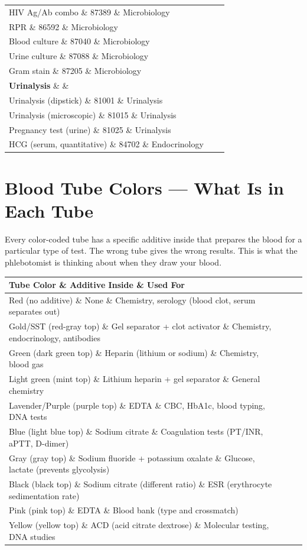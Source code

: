 \begin{longtable}{@{}lll@{}}
HIV Ag/Ab combo \& 87389 \& Microbiology \\
RPR \& 86592 \& Microbiology \\
Blood culture \& 87040 \& Microbiology \\
Urine culture \& 87088 \& Microbiology \\
Gram stain \& 87205 \& Microbiology \\
\textbf{Urinalysis} \& \& \\
Urinalysis (dipstick) \& 81001 \& Urinalysis \\
Urinalysis (microscopic) \& 81015 \& Urinalysis \\
Pregnancy test (urine) \& 81025 \& Urinalysis \\
HCG (serum, quantitative) \& 84702 \& Endocrinology \\
\bottomrule
\end{longtable}

\clearpage
\section{Blood Tube Colors --- What Is in Each Tube}

Every color-coded tube has a specific additive inside that prepares the blood for a particular type of test. The wrong tube gives the wrong results. This is what the phlebotomist is thinking about when they draw your blood.

\begin{longtable}{@{}lll@{}}
\toprule
\textbf{Tube Color} \& \textbf{Additive Inside} \& \textbf{Used For} \\
\midrule
Red (no additive) \& None \& Chemistry, serology (blood clot, serum separates out) \\
Gold/SST (red-gray top) \& Gel separator + clot activator \& Chemistry, endocrinology, antibodies \\
Green (dark green top) \& Heparin (lithium or sodium) \& Chemistry, blood gas \\
Light green (mint top) \& Lithium heparin + gel separator \& General chemistry \\
Lavender/Purple (purple top) \& EDTA \& CBC, HbA1c, blood typing, DNA tests \\
Blue (light blue top) \& Sodium citrate \& Coagulation tests (PT/INR, aPTT, D-dimer) \\
Gray (gray top) \& Sodium fluoride + potassium oxalate \& Glucose, lactate (prevents glycolysis) \\
Black (black top) \& Sodium citrate (different ratio) \& ESR (erythrocyte sedimentation rate) \\
Pink (pink top) \& EDTA \& Blood bank (type and crossmatch) \\
Yellow (yellow top) \& ACD (acid citrate dextrose) \& Molecular testing, DNA studies \\
\bottomrule
\end{longtable}

